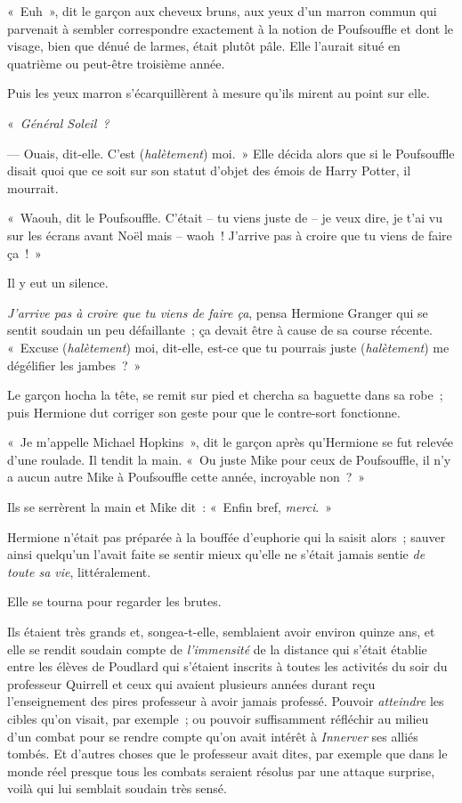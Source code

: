 «~Euh~», dit le garçon aux cheveux bruns, aux yeux d'un marron commun qui parvenait à sembler correspondre exactement à la notion de Poufsouffle et dont le visage, bien que dénué de larmes, était plutôt pâle.
Elle l'aurait situé en quatrième ou peut-être troisième année.

Puis les yeux marron s'écarquillèrent à mesure qu'ils mirent au point sur elle.

«~\emph{Général Soleil~?}

--- Ouais, dit-elle.
C'est (\emph{halètement}) moi.~»
Elle décida alors que si le Poufsouffle disait quoi que ce soit sur son statut d'objet des émois de Harry Potter, il mourrait.

«~Waouh, dit le Poufsouffle.
C'était -- tu viens juste de -- je veux dire, je t'ai vu sur les écrans avant Noël mais -- waoh~!
J'arrive pas à croire que tu viens de faire ça~!~»

Il y eut un silence.

\emph{J'arrive pas à croire que tu viens de faire ça}, pensa Hermione Granger qui se sentit soudain un peu défaillante~; ça devait être à cause de sa course récente.
«~Excuse (\emph{halètement}) moi, dit-elle, est-ce que tu pourrais juste (\emph{halètement}) me dégélifier les jambes~?~»

Le garçon hocha la tête, se remit sur pied et chercha sa baguette dans sa robe~; puis Hermione dut corriger son geste pour que le contre-sort fonctionne.

«~Je m'appelle Michael Hopkins~», dit le garçon après qu'Hermione se fut relevée d'une roulade.
Il tendit la main.
«~Ou juste Mike pour ceux de Poufsouffle, il n'y a aucun autre Mike à Poufsouffle cette année, incroyable non~?~»

Ils se serrèrent la main et Mike dit~: «~Enfin bref, \emph{merci}.~»

Hermione n'était pas préparée à la bouffée d'euphorie qui la saisit alors~; sauver ainsi quelqu'un l'avait faite se sentir mieux qu'elle ne s'était jamais sentie \emph{de toute sa vie}, littéralement.

Elle se tourna pour regarder les brutes.

Ils étaient très grands et, songea-t-elle, semblaient avoir environ quinze ans, et elle se rendit soudain compte de \emph{l'immensité} de la distance qui s'était établie entre les élèves de Poudlard qui s'étaient inscrits à toutes les activités du soir du professeur Quirrell et ceux qui avaient plusieurs années durant reçu l'enseignement des pires professeur à avoir jamais professé.
Pouvoir \emph{atteindre} les cibles qu'on visait, par exemple~; ou pouvoir suffisamment réfléchir au milieu d'un combat pour se rendre compte qu'on avait intérêt à \emph{Innerver} ses alliés tombés.
Et d'autres choses que le professeur avait dites, par exemple que dans le monde réel presque tous les combats seraient résolus par une attaque surprise, voilà qui lui semblait soudain très sensé.

